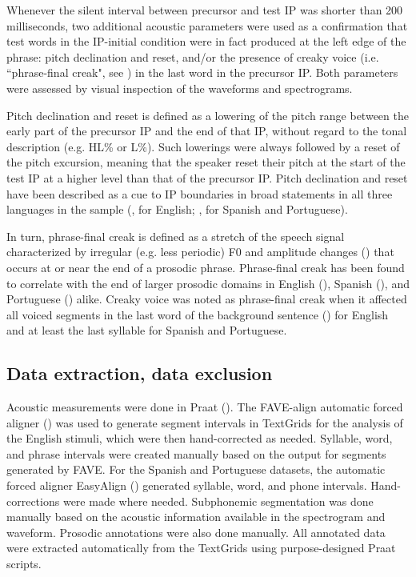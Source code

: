 \documentclass[output=paper]{langscibook}
\begin{document}
Whenever the silent interval between precursor and test IP was shorter than 200 milliseconds, two additional acoustic parameters were used as a confirmation that test words in the IP-initial condition were in fact produced at the left edge of the phrase: pitch declination and reset, and/or the presence of creaky voice (i.e. ``phrase-final creak", see \citealt{g15}) in the last word in the precursor IP. Both parameters were assessed by visual inspection of the waveforms and spectrograms.

Pitch declination and reset is defined as a lowering of the pitch range between the early part of the precursor IP and the end of that IP, without regard to the tonal description (e.g. HL\% or L\%). Such lowerings were always followed by a reset of the pitch excursion, meaning that the speaker reset their pitch at the start of the test IP at a higher level than that of the precursor IP. Pitch declination and reset have been described as a cue to IP boundaries in broad statements in all three languages in the sample (\citealt{ph90}, for English; \citealt{fdepv07}, for Spanish and Portuguese). 

In turn, phrase-final creak is defined as a stretch of the speech signal characterized by irregular (e.g. less periodic) F0 and amplitude changes (\citealt{rsh01, g15}) that occurs at or near the end of a prosodic phrase. Phrase-final creak has been found to correlate with the end of larger prosodic domains in English (\citealt{rsh01}), Spanish (\citealt{dbp10}), and Portuguese (\citealt{fm16}) alike. Creaky voice was noted as phrase-final creak when it affected all voiced segments in the last word of the background sentence (\citealt{g15}) for English and at least the last syllable for Spanish and Portuguese. 


\subsection{Data extraction, data exclusion}\largerpage
Acoustic measurements were done in Praat (\citealt{bw11}). The FAVE-align automatic forced aligner (\citealt{rfesgpy14}) was used to generate segment intervals in TextGrids for the analysis of the English stimuli, which were then hand-corrected as needed. Syllable, word, and phrase intervals were created manually based on the output for segments generated by FAVE. For the Spanish and Portuguese datasets, the automatic forced aligner EasyAlign (\citealt{g11}) generated syllable, word, and phone intervals. Hand-corrections were made where needed. Subphonemic segmentation was done manually based on the acoustic information available in the spectrogram and waveform. Prosodic annotations were also done manually. All annotated data were extracted automatically from the TextGrids using purpose-designed Praat scripts. 
\end{document}
